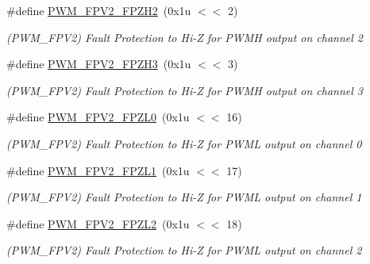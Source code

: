 \begin{DoxyCompactItemize}
\#define \mbox{\hyperlink{group__SAMV71__PWM_gabdd5ede76d1d9f0eb5df161a76c9aa33}{P\+W\+M\+\_\+\+F\+P\+V2\+\_\+\+F\+P\+Z\+H2}}~(0x1u $<$$<$ 2)
\begin{DoxyCompactList}\small\item\em (P\+W\+M\+\_\+\+F\+P\+V2) Fault Protection to Hi-\/Z for P\+W\+MH output on channel 2 \end{DoxyCompactList}\item 
\mbox{\label{group__SAMV71__PWM_gaa59d7dd046e39434bffb3cf9898a1300}} 
\#define \mbox{\hyperlink{group__SAMV71__PWM_gaa59d7dd046e39434bffb3cf9898a1300}{P\+W\+M\+\_\+\+F\+P\+V2\+\_\+\+F\+P\+Z\+H3}}~(0x1u $<$$<$ 3)
\begin{DoxyCompactList}\small\item\em (P\+W\+M\+\_\+\+F\+P\+V2) Fault Protection to Hi-\/Z for P\+W\+MH output on channel 3 \end{DoxyCompactList}\item 
\mbox{\label{group__SAMV71__PWM_ga6d62ea6f94ef657bc673108d69c2fb0c}} 
\#define \mbox{\hyperlink{group__SAMV71__PWM_ga6d62ea6f94ef657bc673108d69c2fb0c}{P\+W\+M\+\_\+\+F\+P\+V2\+\_\+\+F\+P\+Z\+L0}}~(0x1u $<$$<$ 16)
\begin{DoxyCompactList}\small\item\em (P\+W\+M\+\_\+\+F\+P\+V2) Fault Protection to Hi-\/Z for P\+W\+ML output on channel 0 \end{DoxyCompactList}\item 
\mbox{\label{group__SAMV71__PWM_ga147127b7839716910ce218d2d95a6bfb}} 
\#define \mbox{\hyperlink{group__SAMV71__PWM_ga147127b7839716910ce218d2d95a6bfb}{P\+W\+M\+\_\+\+F\+P\+V2\+\_\+\+F\+P\+Z\+L1}}~(0x1u $<$$<$ 17)
\begin{DoxyCompactList}\small\item\em (P\+W\+M\+\_\+\+F\+P\+V2) Fault Protection to Hi-\/Z for P\+W\+ML output on channel 1 \end{DoxyCompactList}\item 
\mbox{\label{group__SAMV71__PWM_ga8dfd8292ee88bbc5d29dfbd95ee13fa5}} 
\#define \mbox{\hyperlink{group__SAMV71__PWM_ga8dfd8292ee88bbc5d29dfbd95ee13fa5}{P\+W\+M\+\_\+\+F\+P\+V2\+\_\+\+F\+P\+Z\+L2}}~(0x1u $<$$<$ 18)
\begin{DoxyCompactList}\small\item\em (P\+W\+M\+\_\+\+F\+P\+V2) Fault Protection to Hi-\/Z for P\+W\+ML output on channel 2 \end{DoxyCompactList}\item 
$$
\end{DoxyCompactItemize}
